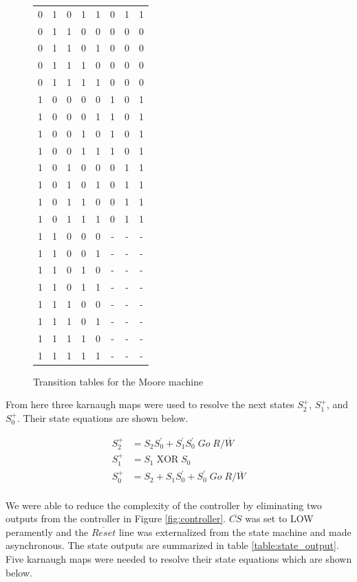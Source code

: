 \documentclass[11pt]{article}
\begin{document}
\begin{figure}[htpb]
{\begin{tabular}{c c c c c | c c c}
			0 & 1 & 0 & 1 & 1 & 0 & 1 & 1 \\
			0 & 1 & 1 & 0 & 0 & 0 & 0 & 0 \\
			0 & 1 & 1 & 0 & 1 & 0 & 0 & 0 \\
			0 & 1 & 1 & 1 & 0 & 0 & 0 & 0 \\
			0 & 1 & 1 & 1 & 1 & 0 & 0 & 0 \\
			1 & 0 & 0 & 0 & 0 & 1 & 0 & 1 \\
			1 & 0 & 0 & 0 & 1 & 1 & 0 & 1 \\
			1 & 0 & 0 & 1 & 0 & 1 & 0 & 1 \\
			1 & 0 & 0 & 1 & 1 & 1 & 0 & 1 \\
			1 & 0 & 1 & 0 & 0 & 0 & 1 & 1 \\
			1 & 0 & 1 & 0 & 1 & 0 & 1 & 1 \\
			1 & 0 & 1 & 1 & 0 & 0 & 1 & 1 \\
			1 & 0 & 1 & 1 & 1 & 0 & 1 & 1 \\
			1 & 1 & 0 & 0 & 0 & - & - & - \\
			1 & 1 & 0 & 0 & 1 & - & - & - \\
			1 & 1 & 0 & 1 & 0 & - & - & - \\
			1 & 1 & 0 & 1 & 1 & - & - & - \\
			1 & 1 & 1 & 0 & 0 & - & - & - \\
			1 & 1 & 1 & 0 & 1 & - & - & - \\
			1 & 1 & 1 & 1 & 0 & - & - & - \\
			1 & 1 & 1 & 1 & 1 & - & - & - \\
		\end{tabular}
	}
	\caption[figurename=Table]{Transition tables for the Moore machine}
	\label{table:transition-moore}
\end{figure}


From here three karnaugh maps were used to resolve the next states $S_2^+$, $S_1^+$, and $S_0^+$. Their state equations are shown below.

\begin{align*}
	S_2^+ &= S_2 S_0^{\prime} + S_1^{\prime} S_0^{\prime}\; Go\; R/\overline{W}\\
	S_1^+ &= S_1\; \text{XOR}\; S_0 \\
	S_0^+ &= S_2 + S_1 S_0^{\prime} + S_0^{\prime}\; Go\; R/\overline{W} \\
\end{align*}

\newpage

We were able to reduce the complexity of the controller by eliminating two outputs from the controller in Figure \ref{fig:controller}. $\overline{CS}$ was set to LOW peramently and the $\overline{Reset}$ line was externalized from the state machine and made asynchronous. The state outputs are summarized in table \ref{table:state_output}. Five karnaugh maps were needed to resolve their state equations which are shown below.
\end{document}
